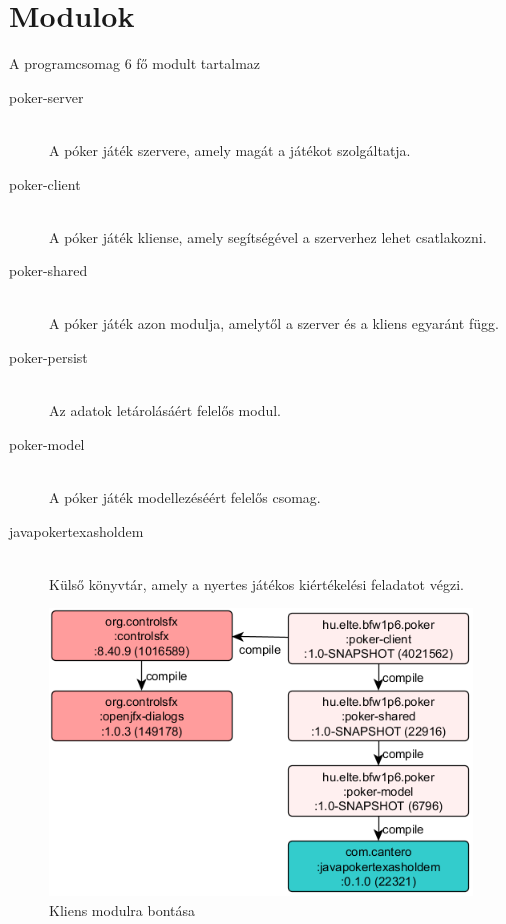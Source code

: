 \section{Modulok}
A programcsomag 6 fő modult tartalmaz
\begin{description}
  \item[poker-server] \hfill \\
  A póker játék szervere, amely magát a játékot szolgáltatja.
  \item[poker-client] \hfill \\
  A póker játék kliense, amely segítségével a szerverhez lehet csatlakozni.
  \item[poker-shared] \hfill \\
   A póker játék azon modulja, amelytől a szerver és a kliens egyaránt függ.
   \item[poker-persist] \hfill \\
   Az adatok letárolásáért felelős modul.
   \item[poker-model] \hfill \\
   A póker játék modellezéséért felelős csomag.
   \item[javapokertexasholdem] \hfill \\
   Külső könyvtár, amely a nyertes játékos kiértékelési feladatot végzi.
\end{description}
\begin{figure}[h!]
	\caption{Kliens modulra bontása}
	\label{fig:client_modul}
	\centering
	\includegraphics{user-documentation/images/poker-client-deps.png}
\end{figure}
